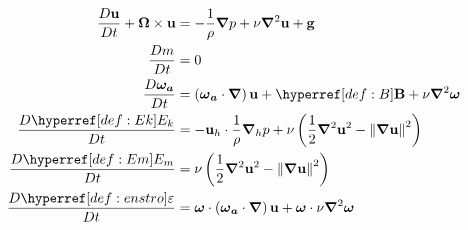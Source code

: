 \begin{subequations} \label{eq:EQS1}
\begin{align}
	\frac{D \vec{u}}{D t}
	+
	\vec{\Omega} \times \vec{u}
	&=
	- \frac{1}{\rho} \vec{\nabla} p
	+
	\nu  \vec{\nabla}^{2} \vec{u}
	+
	 \vec{g}
	  \label{eq:NS2} \\
	\frac{D m}{D t}
	&=
	0 \label{eq:konti1}\\
	\frac{D \vec{\omega_{a}}}{D t}
	&=
	\left( \vec{\vec{\omega}_{a}} \cdot \grad \right) \vec{\vec{u}}
	+
	\B
	+
	\nu \grad^2 \vec{\omega}
		\label{eq:vort1}\\
	\frac{D \Ek}{D t}
	&=
	-
	\vec{u}_{h} \cdot \frac{1}{\rho} \grad_{h} p
	+
	\nu \left(
	\frac{1}{2}\grad^2 \vec{u}^2 - \norm{\grad \vec{u}}^2
\right)
	\label{eq:Ekin1}\\
	\frac{D \Em}{D t}
	&=
	\nu	\left(
	\frac{1}{2}\grad^2 \vec{u}^2 - \norm{\grad \vec{u}}^2
	\right)
	\label{eq:Emech1}\\
	\frac{D \enstro}{D t}
	&=
	\vec{\omega}\cdot \left( \vec{\vec{\omega}_{a}} \cdot \grad \right) \vec{\vec{u}}
	+
	\vec{\omega}\cdot  \nu \grad^{2} \vec{\omega}
	\label{eq:enst1}
\end{align}
\end{subequations}
